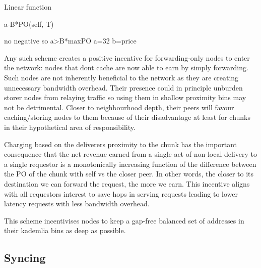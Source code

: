\documentclass[a4paper,10pt,fullpage]{article}
\numberwithin{equation}{section}
\theoremstyle{definition}
\begin{document}
Linear function

a-B*PO(self, T)

no negative so a>B*maxPO
a=32 b=price

Any such scheme creates a positive incentive for forwarding-only nodes to enter the network:
nodes that dont cache are now able to earn by simply forwarding. Such nodes are not inherently beneficial to the network as they are creating unnecessary bandwidth overhead. Their presence could in principle unburden storer nodes from relaying traffic so using them in shallow proximity bins may not be detrimental.
Closer to neighbourhood depth, their peers will favour caching/storing nodes to them because of their disadvantage at least for chunks in their hypothetical area of responsibility.

Charging based on the deliverers proximity to the chunk has the important consequence that the net revenue earned from a single act of non-local delivery to a single requestor is a monotonically increasing function of the difference between the PO of the chunk with self vs the closer peer. In other words, the closer to its destination we can forward the request, the more we earn. 
This incentive aligns with all requestors interest to save hops in serving requests leading to lower latency requests with less bandwidth overhead.

This scheme incentivises nodes to keep a gap-free balanced set of addresses in their kademlia bins as deep as possible.



\subsection{Syncing}
\end{document}
